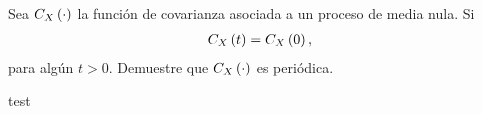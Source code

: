 \documentclass[../main.tex]{subfiles}
\begin{document}
    \begin{enunciado}
    	Sea $C_X\left( \cdot \right)$ la función de covarianza asociada a un proceso de media nula. Si
            \begin{align*}
            	C_X\left( t \right) = C_X\left( 0 \right),
            \end{align*}
        para algún $t > 0$. Demuestre que $C_X\left( \cdot \right)$ es periódica.
    \end{enunciado}

    \begin{demostracion}
        test
    \end{demostracion}
\end{document}
